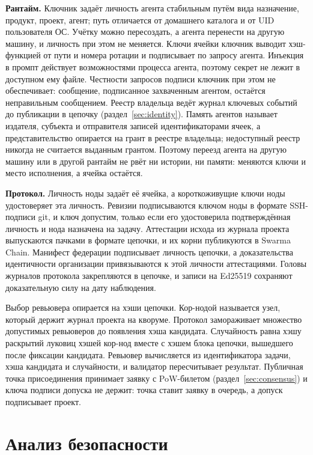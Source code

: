 \documentclass[10pt,a4paper]{article}
\begin{document}
\textbf{Рантайм.}
Ключник задаёт личность агента стабильным путём вида назначение, продукт, проект, агент; путь отличается от домашнего каталога и от UID пользователя ОС.
Учётку можно пересоздать, а агента перенести на другую машину, и личность при этом не меняется.
Ключи ячейки ключник выводит хэш-функцией от пути и номера ротации и подписывает по запросу агента.
Инъекция в промпт действует возможностями процесса агента, поэтому секрет не лежит в доступном ему файле.
Честности запросов подписи ключник при этом не обеспечивает: сообщение, подписанное захваченным агентом, остаётся неправильным сообщением.
Реестр владельца ведёт журнал ключевых событий до публикации в цепочку (раздел~\ref{sec:identity}).
Память агентов называет издателя, субъекта и отправителя записей идентификаторами ячеек, а представительство опирается на грант в реестре владельца; недоступный реестр никогда не считается выданным грантом.
Поэтому переезд агента на другую машину или в другой рантайм не рвёт ни истории, ни памяти: меняются ключи и место исполнения, а ячейка остаётся.

\textbf{Протокол.}
Личность ноды задаёт её ячейка, а короткоживущие ключи ноды удостоверяет эта личность.
Ревизии подписываются ключом ноды в формате SSH-подписи git, и ключ допустим, только если его удостоверила подтверждённая личность и нода назначена на задачу.
Аттестации исхода из журнала проекта выпускаются пачками в формате цепочки, и их корни публикуются в Swarma Chain.
Манифест федерации подписывает личность цепочки, а доказательства идентичности организации привязываются к этой личности аттестациями.
Головы журналов протокола закрепляются в цепочке, и записи на Ed25519 сохраняют доказательную силу на дату наблюдения.

Выбор ревьювера опирается на хэши цепочки.
Кор-нодой называется узел, который держит журнал проекта на кворуме.
Протокол замораживает множество допустимых ревьюверов до появления хэша кандидата.
Случайность равна хэшу раскрытий луковиц хэшей кор-нод вместе с хэшем блока цепочки, вышедшего после фиксации кандидата.
Ревьювер вычисляется из идентификатора задачи, хэша кандидата и случайности, и валидатор пересчитывает результат.
Публичная точка присоединения принимает заявку с PoW-билетом (раздел~\ref{sec:consensus}) и ключа подписи допуска не держит: точка ставит заявку в очередь, а допуск подписывает проект.

\section{Анализ безопасности}
\label{sec:security}
\end{document}
